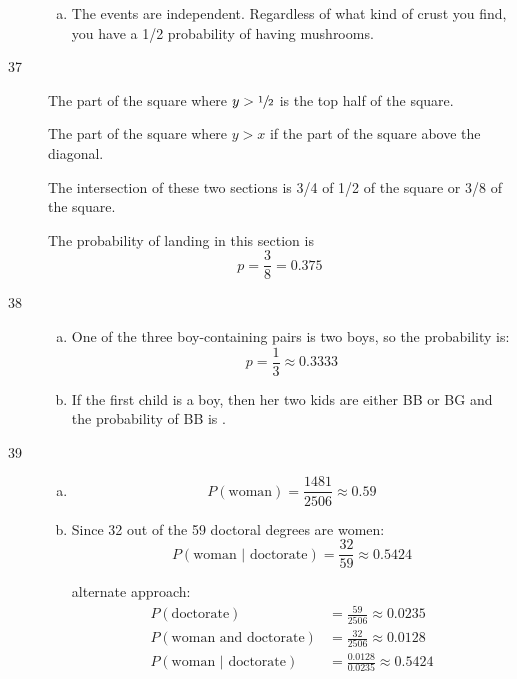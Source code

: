 \documentclass[letterpaper, landscape]{exam}
\begin{document}
\begin{description}
\begin{enumerate}[(a)]
          \item The events are independent. Regardless of what kind of crust you
            find, you have a 1/2 probability of having mushrooms.
        \end{enumerate}

      \item[37]
        The part of the square where $y > \sfrac{1}{2}$ is the top half of the
        square.

        The part of the square where $y > x$ if the part of the square above the
        diagonal.

        The intersection of these two sections is 3/4 of 1/2 of the square or
        3/8 of the square. 
        
        The probability of landing in this section is 
        \[
          p = \frac{3}{8} = \boxed{ 0.375 }
        \]

      \item[38]
        \begin{enumerate}[(a)]
          \item One of the three boy-containing pairs is two boys, so the
            probability is:
            \[
              p = \frac{1}{3} \approx \boxed{ 0.3333 }
            \]

          \item If the first child is a boy, then her two kids are either BB or
            BG and the probability of BB is .
        \end{enumerate}

      \item[39]
        \begin{enumerate}[(a)]
          \item 
            \[
              P(\text{woman}) = \frac{1481}{2506} \approx \boxed{ 0.59 }
            \]

          \item
            Since 32 out of the 59 doctoral degrees are women:
            \[
              P( \text{woman } | \text { doctorate} ) = \frac{32}{59} 
                \approx \boxed{ 0.5424 }
            \]

            alternate approach:
            \begin{align*}
              P( \text{doctorate} )                   & = \frac{59}{2506} \approx 0.0235 \\
              P( \text{woman and doctorate} )         & = \frac{32}{2506} \approx 0.0128 \\
              P( \text{woman } | \text { doctorate} ) & = \frac{0.0128}{0.0235}
                \approx 0.5424 \\
            \end{align*}


\end{enumerate}
\end{description}
\end{document}
